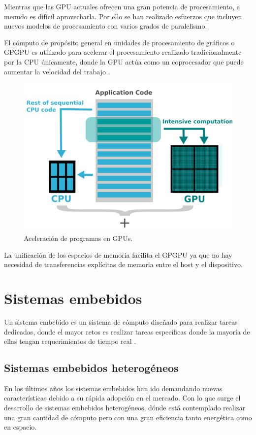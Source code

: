     Mientras que las GPU actuales ofrecen una gran potencia de procesamiento, a menudo es difícil aprovecharla. Por ello se han realizado esfuerzos que incluyen nuevos modelos de procesamiento con varios grados de paralelismo.
    
    El cómputo de propósito general en unidades de procesamiento de gráficos o GPGPU es utilizado para acelerar el procesamiento realizado tradicionalmente por la CPU únicamente, donde la GPU actúa como un coprocesador que puede aumentar la velocidad del trabajo \cite{GpuCpu}.

    \begin{figure}[ht]
      \centering
        \includegraphics[scale=0.9]{img/gpgpu}
        \caption{Aceleración de programas en GPUs\cite{gpgpu}.}
        \label{fig:gpgpu}
    \end{figure}

    La unificación de los espacios de memoria facilita el GPGPU ya que no hay necesidad de transferencias explícitas de memoria entre el host y el dispositivo.


    \section{Sistemas embebidos}

    Un sistema embebido es un sistema de cómputo diseñado para realizar tareas dedicadas, donde el mayor retos es realizar tareas específicas donde la mayoría de ellas tengan requerimientos de tiempo real \cite{LimPree}.

    \subsection{Sistemas embebidos heterogéneos}
    \vspace{0.3cm}
    En los últimos años los sistemas embebidos han ido demandando nuevas características debido a su rápida adopción en el mercado. Con lo que surge el desarrollo de sistemas embebidos heterogéneos, dónde está contemplado realizar una gran cantidad de cómputo pero con una gran eficiencia tanto energética como en espacio.
    \vspace{0.3cm}


